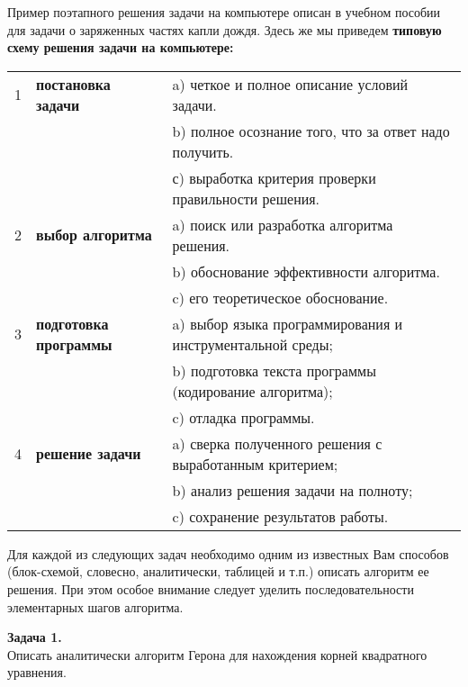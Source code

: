 Пример поэтапного решения задачи на компьютере описан в учебном пособии для задачи о заряженных частях капли дождя. Здесь же мы приведем {\bf типовую схему решения задачи на компьютере:}
\vspace{5mm}

\begin{tabular}{ | l | l | l | }
\hline
1 & {\bf постановка задачи} & a) четкое и полное описание условий задачи. \\ 
    &                                                  & b) полное осознание того, что за ответ надо получить. \\ 
    &                                                  & с) выработка критерия проверки правильности решения. \\ \hline
2 & {\bf выбор алгоритма}   & a) поиск или разработка алгоритма решения. \\ 
   &                                                  & b) обоснование эффективности алгоритма. \\ 
   &                                                  &c) его теоретическое обоснование.\\ \hline
3 & {\bf подготовка программы} & a) выбор языка программирования и инструментальной среды;  \\ 
   &                                                            &b) подготовка текста программы (кодирование алгоритма);\\ 
   &                                                            &c) отладка программы.\\ \hline
4 & {\bf решение задачи} & a)  сверка полученного решения с выработанным критерием; \\
   &                                              &b) анализ решения задачи на полноту;\\ 
   &                                              &c) сохранение результатов работы.\\ 
\hline
\end{tabular}

\vspace{5mm}
Для каждой из следующих задач необходимо одним из известных Вам способов (блок-схемой, словесно, аналитически, таблицей и т.п.) описать алгоритм ее решения. При этом особое внимание следует уделить последовательности элементарных ша­гов алгоритма.

{\bf Задача 1.}\\ 
Описать аналитически алгоритм Герона для нахождения корней квадратного уравнения.

